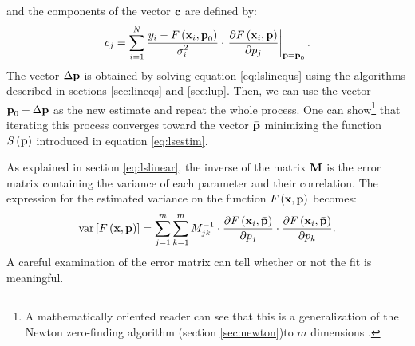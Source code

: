 and the components of the vector ${\textbf c}$ are defined by:
\begin{equation}
\label{eq:lsvector}
  c_j=\sum_{i=1}^N {\displaystyle
  y_i-F\left({\textbf x}_i,{\textbf
p}_0\right)\over\displaystyle\sigma_i^2}\cdot\left.{\displaystyle\partial
F\left({\textbf x}_i,{\textbf p}\right)\over\displaystyle\partial
p_j}\right|_{{\textbf p}={\textbf p}_0}.
\end{equation}
The vector $\Delta{\textbf p}$ is obtained by solving equation
\ref{eq:lslinequs} using the algorithms described in sections
\ref{sec:lineqs} and \ref{sec:lup}. Then, we can use the vector
${\textbf p}_0+\Delta{\textbf p}$ as the new estimate and repeat the whole
process. One can show\footnote{A mathematically oriented reader
can see that this is a generalization of the Newton zero-finding
algorithm (\cf section \ref{sec:newton})to $m$ dimensions .} that
iterating this process converges toward the vector $\bar{\textbf p}$
minimizing the function $S\left({\textbf p}\right)$ introduced in
equation \ref{eq:lsestim}.

As explained in section \ref{eq:lslinear}, the inverse of the
matrix ${\textbf M}$ is the error matrix containing the variance of
each parameter and their correlation. The expression for the
estimated variance on the function $F\left({\textbf x},{\textbf p}\right)$
becomes:
\begin{equation}
\label{eq:nllserror}
  \mathop{\textrm{var}}\left[F\left({\textbf x},{\textbf p}\right)\right]=
  \sum_{j=1}^m\sum_{k=1}^m M_{jk}^{-1}\cdot
  {\displaystyle\partial F\left({\textbf x}_i,\bar{\textbf
p}\right)\over\displaystyle\partial
p_j}\cdot{\displaystyle\partial F\left({\textbf x}_i,\bar{\textbf
p}\right)\over\displaystyle\partial p_k}.
\end{equation}
A careful examination of the error matrix can tell whether or not
the fit is meaningful.

